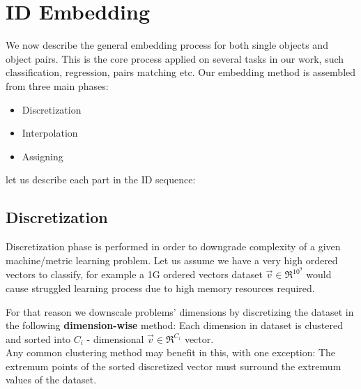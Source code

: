
\chapter{ID Embedding} %

\label{Chapter2} %




We now describe the general embedding process for both single objects and object pairs. This is the core process applied on several tasks in our work, such classification, regression, pairs matching etc.
Our embedding method is assembled from three main phases:

\begin{itemize}
	\item Discretization
	\item Interpolation
	\item Assigning
\end{itemize}

let us describe each part in the ID sequence:

\section{Discretization}
Discretization phase is performed in order to downgrade complexity of a given machine/metric learning problem. 
Let us assume we have a very high ordered vectors to classify, for example a 1G ordered vectors dataset $\overrightarrow{v} \in \Re^{10^9}$ would cause struggled learning process due to high memory resources required.

For that reason we downscale problems’ dimensions by discretizing the dataset in the following \textbf{dimension-wise} method:
Each dimension in dataset is clustered and sorted into $C_i$ - dimensional $\overrightarrow{v} \in \Re^{C_i}$ vector.\\
Any common clustering method may benefit in this, with one exception:
The extremum points of the sorted discretized vector must surround the extremum values of the dataset.

